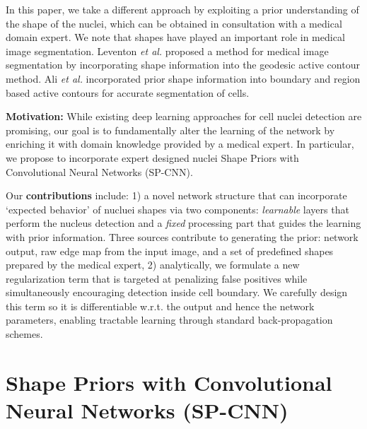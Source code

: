 \documentclass{article}
\begin{document}
In this paper, we take a different approach by exploiting a prior understanding of the shape of the nuclei, which can be obtained in consultation with a medical domain expert. We note that
shapes have played an important role in medical image segmentation. Leventon \textit{et al.} \cite{Leventon_SP_2000} proposed a method for medical image segmentation by incorporating shape information into the geodesic active contour method. Ali \textit{et al.} \cite{Ali_SP_2012} incorporated prior shape information into boundary and region based active contours for accurate segmentation of cells. 




\noindent \textbf{Motivation:}
While existing deep learning approaches for cell nuclei detection are promising, our goal is to fundamentally alter the learning of the network by enriching it with domain knowledge provided by a medical expert. In particular, we propose to incorporate expert designed nuclei Shape Priors with Convolutional Neural Networks (SP-CNN). 

Our \textbf{contributions} include: 1) a novel network structure that can incorporate `expected behavior' of nucluei shapes via two components: {\em learnable} layers that perform the nucleus detection and a {\em fixed} processing part that guides the learning with prior information. Three sources contribute to generating the prior: network output, raw edge map from the input image, and a set of predefined shapes prepared by the medical expert, 2) analytically, we formulate a new regularization term that is targeted at penalizing false positives while simultaneously encouraging detection inside cell boundary. We carefully design this term so it is differentiable w.r.t. the output and hence the network parameters, enabling tractable learning through standard back-propagation schemes. \vspace{-3pt}

\section{Shape Priors with Convolutional Neural Networks (SP-CNN)}\vspace{-3pt}
\end{document}
